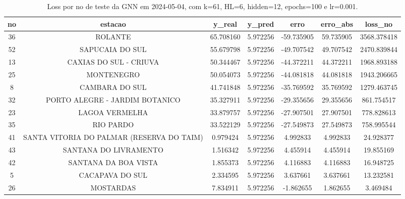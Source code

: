 \begin{table}[h]
\centering
\caption{Loss por no de teste da GNN em 2024-05-04, com k=61, HL=6, hidden=12, epochs=100 e lr=0.001.}
\label{tab:gnn_loss_k61_hl6_h12_e100_d20240504}
\begin{tabular}{ccccccc}
\toprule
no & estacao & y\_real & y\_pred & erro & erro\_abs & loss\_no \\
\midrule
36 & ROLANTE & 65.708160 & 5.972256 & -59.735905 & 59.735905 & 3568.378418 \\
52 & SAPUCAIA DO SUL & 55.679798 & 5.972256 & -49.707542 & 49.707542 & 2470.839844 \\
13 & CAXIAS DO SUL - CRIUVA & 50.344467 & 5.972256 & -44.372211 & 44.372211 & 1968.893188 \\
25 & MONTENEGRO & 50.054073 & 5.972256 & -44.081818 & 44.081818 & 1943.206665 \\
8 & CAMBARA DO SUL & 41.741848 & 5.972256 & -35.769592 & 35.769592 & 1279.463745 \\
32 & PORTO ALEGRE - JARDIM BOTANICO & 35.327911 & 5.972256 & -29.355656 & 29.355656 & 861.754517 \\
23 & LAGOA VERMELHA & 33.879757 & 5.972256 & -27.907501 & 27.907501 & 778.828613 \\
35 & RIO PARDO & 33.522129 & 5.972256 & -27.549873 & 27.549873 & 758.995544 \\
41 & SANTA VITORIA DO PALMAR (RESERVA DO TAIM) & 0.979424 & 5.972256 & 4.992833 & 4.992833 & 24.928377 \\
43 & SANTANA DO LIVRAMENTO & 1.516342 & 5.972256 & 4.455914 & 4.455914 & 19.855169 \\
42 & SANTANA DA BOA VISTA & 1.855373 & 5.972256 & 4.116883 & 4.116883 & 16.948725 \\
5 & CACAPAVA DO SUL & 2.334595 & 5.972256 & 3.637661 & 3.637661 & 13.232581 \\
26 & MOSTARDAS & 7.834911 & 5.972256 & -1.862655 & 1.862655 & 3.469484 \\
\bottomrule
\end{tabular}
\end{table}

